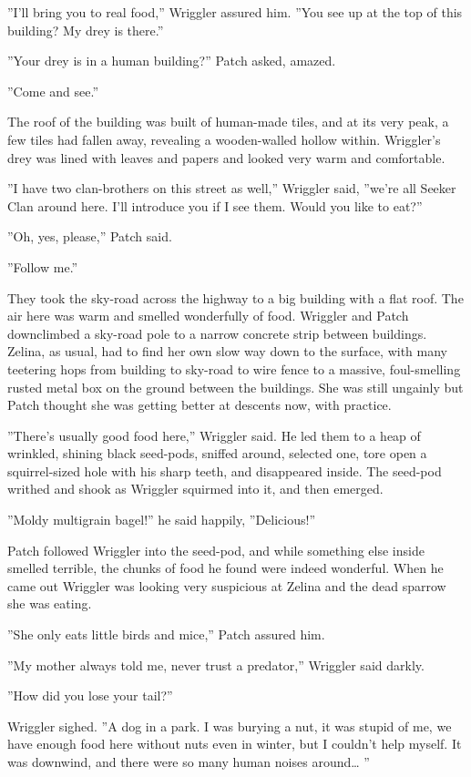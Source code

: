 \documentclass[12pt]{book}
\begin{document}
''I'll bring you to real food,'' Wriggler assured him. ''You see up at the top of this building? My drey is there.''

''Your drey is in a human building?'' Patch asked, amazed.

''Come and see.''

The roof of the building was built of human-made tiles, and at its very peak, a few tiles had fallen away, revealing a wooden-walled hollow within. Wriggler's drey was lined with leaves and papers and looked very warm and comfortable.

''I have two clan-brothers on this street as well,'' Wriggler said, ''we're all Seeker Clan around here. I'll introduce you if I see them. Would you like to eat?''

''Oh, yes, please,'' Patch said.

''Follow me.''

They took the sky-road across the highway to a big building with a flat roof. The air here was warm and smelled wonderfully of food. Wriggler and Patch downclimbed a sky-road pole to a narrow concrete strip between buildings. Zelina, as usual, had to find her own slow way down to the surface, with many teetering hops from building to sky-road to wire fence to a massive, foul-smelling rusted metal box on the ground between the buildings. She was still ungainly but Patch thought she was getting better at descents now, with practice.

''There's usually good food here,'' Wriggler said. He led them to a heap of wrinkled, shining black seed-pods, sniffed around, selected one, tore open a squirrel-sized hole with his sharp teeth, and disappeared inside. The seed-pod writhed and shook as Wriggler squirmed into it, and then emerged.

''Moldy multigrain bagel!'' he said happily, ''Delicious!''

Patch followed Wriggler into the seed-pod, and while something else inside smelled terrible, the chunks of food he found were indeed wonderful. When he came out Wriggler was looking very suspicious at Zelina and the dead sparrow she was eating.

''She only eats little birds and mice,'' Patch assured him.

''My mother always told me, never trust a predator,'' Wriggler said darkly.

''How did you lose your tail?''

Wriggler sighed. ''A dog in a park. I was burying a nut, it was stupid of me, we have enough food here without nuts even in winter, but I couldn't help myself. It was downwind, and there were so many human noises around\ldots{}
''
\end{document}
